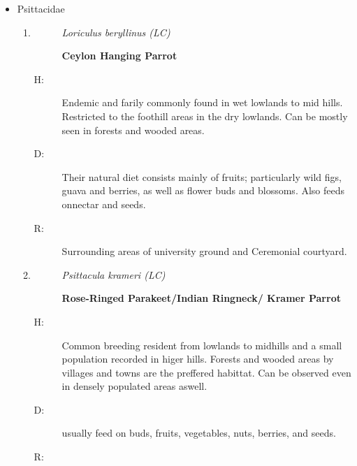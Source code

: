 \begin{itemize}
\begin{enumerate}
%
\end{enumerate}%
\item%
Psittacidae%
\begin{enumerate}%
\item%
\begin{description}%
\item[]%
\textit{Loriculus beryllinus (LC)}%
\item[]%
\textbf{Ceylon Hanging Parrot}%
\end{description}%
\begin{description}%
\item[H: ]%
Endemic and farily commonly found in wet lowlands to mid hills. Restricted to the foothill areas in the dry lowlands. Can be mostly seen in forests and wooded areas.%
\item[D: ]%
Their natural diet consists mainly of fruits; particularly wild figs, guava and berries, as well as flower buds and blossoms. Also feeds onnectar and seeds.%
\item[R: ]%
Surrounding areas of university ground and Ceremonial courtyard.%
\end{description}%
\item%
\begin{description}%
\item[]%
\textit{Psittacula krameri (LC)}%
\item[]%
\textbf{Rose{-}Ringed Parakeet/Indian Ringneck/ Kramer Parrot}%
\end{description}%
\begin{description}%
\item[H: ]%
Common breeding resident from lowlands to midhills and a small population recorded in higer hills. Forests and wooded areas by villages and towns are the preffered habittat. Can be observed even in densely populated areas aswell.%
\item[D: ]%
usually feed on buds, fruits, vegetables, nuts, berries, and seeds.%
\item[R: ]%

\end{description}
\end{enumerate}
\end{itemize}
